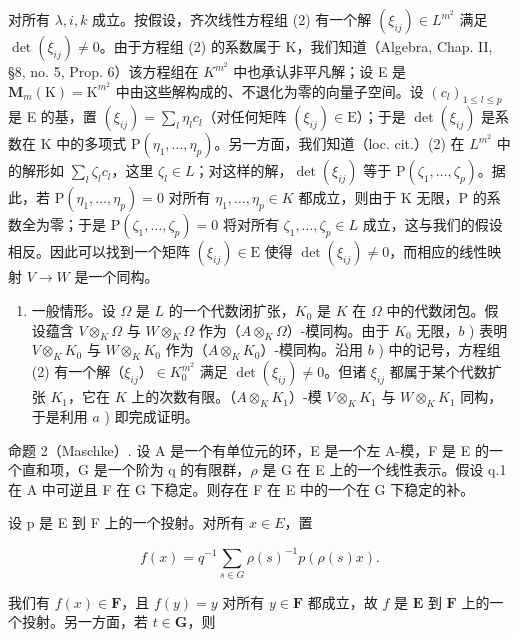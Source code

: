 对所有 \(\lambda, i, k\) 成立。按假设，齐次线性方程组 (2) 有一个解 \((\xi_{ij}) \in L^{m^2}\) 满足 \(\det(\xi_{ij}) \neq 0\)。由于方程组 (2) 的系数属于 K，我们知道（Algebra, Chap. II, §8, no. 5, Prop. 6）该方程组在 \(K^{m^2}\) 中也承认非平凡解；设 E 是 \(\mathbf{M}_{m}(\mathrm{K})=\mathrm{K}^{m^{2}}\) 中由这些解构成的、不退化为零的向量子空间。设 \((c_{l})_{1\leqslant l\leqslant p}\) 是 E 的基，置 \((\xi_{ij})=\sum_{l}\eta_{l}c_{l}\)（对任何矩阵 \((\xi_{ij})\in\mathrm{E}\)）；于是 \(\det(\xi_{ij})\) 是系数在 K 中的多项式 \(\mathrm{P}(\eta_{1},\ldots,\eta_{p})\)。另一方面，我们知道（loc. cit.）(2) 在 \(L^{m^{2}}\) 中的解形如 \(\sum_{l}\zeta_{l}c_{l}\)，这里 \(\zeta_{l}\in L\)；对这样的解，\(\det(\xi_{ij})\) 等于 \(\mathrm{P}(\zeta_{1},\ldots,\zeta_{p})\)。据此，若 \(\mathrm{P}(\eta_{1},\ldots,\eta_{p})=0\) 对所有 \(\eta_{1},\ldots,\eta_{p}\in K\) 都成立，则由于 K 无限，P 的系数全为零；于是 \(\mathrm{P}(\zeta_{1},\ldots,\zeta_{p})=0\) 将对所有 \(\zeta_{1},\ldots,\zeta_{p}\in L\) 成立，这与我们的假设相反。因此可以找到一个矩阵 \((\xi_{ij})\in\mathrm{E}\) 使得 \(\det(\xi_{ij})\neq0\)，而相应的线性映射 \(V\to W\) 是一个同构。

\begin{enumerate}
\def\labelenumi{\alph{enumi})}
\setcounter{enumi}{2}
\tightlist
\item
  一般情形。设 \(\Omega\) 是 \(L\) 的一个代数闭扩张，\(K_0\) 是 \(K\) 在 \(\Omega\) 中的代数闭包。假设蕴含 \(V \otimes_K \Omega\) 与 \(W \otimes_K \Omega\) 作为（\(A \otimes_K \Omega\)）-模同构。由于 \(K_0\) 无限，\(b\) ) 表明 \(V \otimes_K K_0\) 与 \(W \otimes_K K_0\) 作为（\(A \otimes_K K_0\)）-模同构。沿用 \(b\) ) 中的记号，方程组 (2) 有一个解（\(\xi_{ij}\)）\(\in K_0^{m^2}\) 满足 \(\det(\xi_{ij}) \neq 0\)。但诸 \(\xi_{ij}\) 都属于某个代数扩张 \(K_1\)，它在 \(K\) 上的次数有限。（\(A \otimes_K K_1\)）-模 \(V \otimes_K K_1\) 与 \(W \otimes_K K_1\) 同构，于是利用 \(a\) ) 即完成证明。
\end{enumerate}

命题 2（Maschke）. 设 A 是一个有单位元的环，E 是一个左 A-模，F 是 E 的一个直和项，G 是一个阶为 q 的有限群，\(\rho\) 是 G 在 E 上的一个线性表示。假设 q.1 在 A 中可逆且 F 在 G 下稳定。则存在 F 在 E 中的一个在 G 下稳定的补。

设 p 是 E 到 F 上的一个投射。对所有 \(x \in E\)，置

\[
f (x) = q ^ {- 1} \sum_ {s \in G} \rho (s) ^ {- 1} p (\rho (s) x).
\]

我们有 \(f(x) \in \mathbf{F}\)，且 \(f(y) = y\) 对所有 \(y \in \mathbf{F}\) 都成立，故 \(f\) 是 \(\mathbf{E}\) 到 \(\mathbf{F}\) 上的一个投射。另一方面，若 \(t \in \mathbf{G}\)，则

